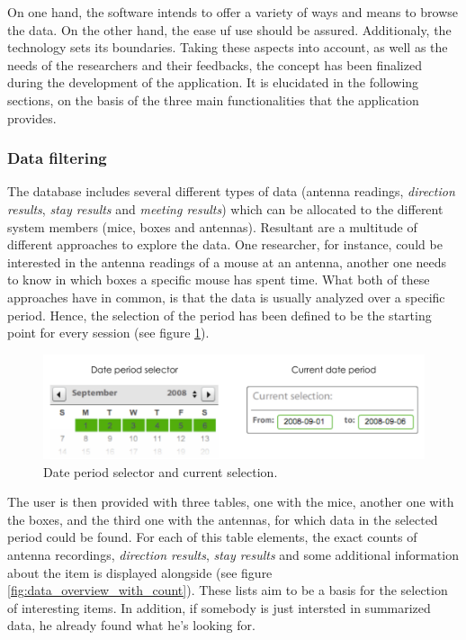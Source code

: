 On one hand, the software intends to offer a variety of ways and means to browse the data. On the other hand, the ease uf use should be assured. Additionaly, the technology sets its boundaries. Taking these aspects into account, as well as the needs of the researchers and their feedbacks, the concept has been finalized during the development of the application. It is elucidated in the following sections, on the basis of the three main functionalities that the application provides. 
   
\subsubsection{Data filtering}
\label{sububsec:datafilter}

The database includes several different types of data (antenna readings, \textit{direction results}, \textit{stay results} and \textit{meeting results}) which can be allocated to the different system members (mice, boxes and antennas). Resultant are a multitude of different approaches to explore the data. One researcher, for instance, could be interested in the antenna readings of a mouse at an antenna, another one needs to know in which boxes a specific mouse has spent time. What both of these approaches have in common, is that the data is usually analyzed over a specific period. Hence, the selection of the period has been defined to be the starting point for every session (see figure \ref{fig:date_period}).

\begin{figure}[htpb]
\begin{center}
  \includegraphics[width=.75\textwidth]{assets/pdf/date_period.pdf}
  \caption[Date period selection]{Date period selector and current selection.}
  \label{fig:date_period}
\end{center}
\end{figure}

The user is then provided with three tables, one with the mice, another one with the boxes, and the third one with the antennas, for which data in the selected period could be found. For each of this table elements, the exact counts of antenna recordings, \textit{direction results}, \textit{stay results} and some additional information about the item is displayed alongside (see figure \ref{fig:data_overview_with_count}). These lists aim to be a basis for the selection of interesting items. In addition, if somebody is just intersted in summarized data, he already found what he's looking for. 

